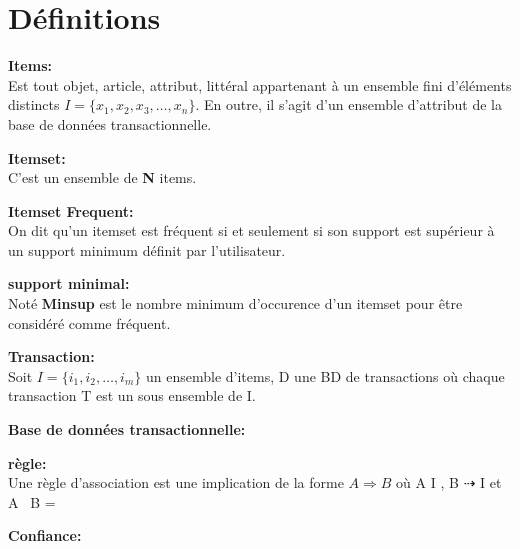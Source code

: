 \documentclass[a4paper,twoside,12pt]{report}   	%
\begin{document}
\section{Définitions}
\textbf{Items:}\\ Est tout objet, article, attribut, littéral appartenant à un ensemble fini d'éléments distincts $I = \{x_1, x_2, x_3, \dots, x_n\}$. En outre, il s'agit d'un ensemble d'attribut de la base de données transactionnelle.
\par \textbf{Itemset:}\\ C'est un ensemble de \textbf{N} items.
\par \textbf{Itemset Frequent:}\\ On dit qu'un itemset est fréquent si et seulement si son support est supérieur à un support minimum définit par l'utilisateur.
\par \textbf{support minimal:}\\ Noté \textbf{Minsup} est le nombre minimum d'occurence d'un itemset pour être considéré comme fréquent.
\par \textbf{Transaction:}\\ Soit $I = \{i_1, i_2, \dots, i_m\}$ un ensemble d’items, D une BD de transactions o\`u chaque transaction T est un sous ensemble de I.
\par \textbf{Base de données transactionnelle:}\\ 
\par \textbf{règle:}\\ Une r\`egle d’association est une implication de la forme $A \Longrightarrow B$ où  A \sqsubseteq I , B ⇢ I et A \ B = {}
\par \textbf{Confiance:}\\ 
\clearpage

\printglossary[title=Special Terms, toctitle=List of terms]
\end{document}
